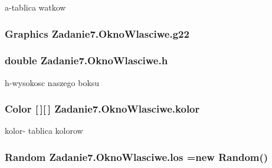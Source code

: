 a-\/tablica watkow 

\subsubsection[{\texorpdfstring{g22}{g22}}]{\setlength{\rightskip}{0pt plus 5cm}Graphics Zadanie7.\+Okno\+Wlasciwe.\+g22\hspace{0.3cm}{\ttfamily [private]}}\hypertarget{class_zadanie7_1_1_okno_wlasciwe_ae40d1f4b0ba77778e9aff178a22d8caf}{}\label{class_zadanie7_1_1_okno_wlasciwe_ae40d1f4b0ba77778e9aff178a22d8caf}
\subsubsection[{\texorpdfstring{h}{h}}]{\setlength{\rightskip}{0pt plus 5cm}double Zadanie7.\+Okno\+Wlasciwe.\+h\hspace{0.3cm}{\ttfamily [private]}}\hypertarget{class_zadanie7_1_1_okno_wlasciwe_ac8bed36b0724579fa1bab6098bbd4204}{}\label{class_zadanie7_1_1_okno_wlasciwe_ac8bed36b0724579fa1bab6098bbd4204}


h-\/wysokosc naszego boksu 

\subsubsection[{\texorpdfstring{kolor}{kolor}}]{\setlength{\rightskip}{0pt plus 5cm}Color \mbox{[}$\,$\mbox{]}\mbox{[}$\,$\mbox{]} Zadanie7.\+Okno\+Wlasciwe.\+kolor\hspace{0.3cm}{\ttfamily [private]}}\hypertarget{class_zadanie7_1_1_okno_wlasciwe_a6adcf3f4cbee43c70583647ed34b9db4}{}\label{class_zadanie7_1_1_okno_wlasciwe_a6adcf3f4cbee43c70583647ed34b9db4}


kolor-\/ tablica kolorow 

\subsubsection[{\texorpdfstring{los}{los}}]{\setlength{\rightskip}{0pt plus 5cm}Random Zadanie7.\+Okno\+Wlasciwe.\+los =new Random()\hspace{0.3cm}{\ttfamily [private]}}\hypertarget{class_zadanie7_1_1_okno_wlasciwe_a9ae176d92e991a053b101aad6fdf7cdf}{}\label{class_zadanie7_1_1_okno_wlasciwe_a9ae176d92e991a053b101aad6fdf7cdf}


